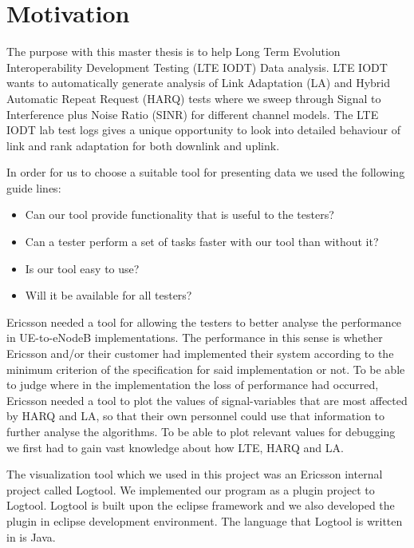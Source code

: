 \documentclass[cropmarks, frame, english]{idamasterthesis}
\begin{document}
\newpage

\section{Motivation}
The purpose with this master thesis is to help Long Term Evolution Interoperability Development Testing (LTE IODT) Data analysis. LTE IODT wants to automatically generate analysis of Link Adaptation (LA) and Hybrid Automatic Repeat Request (HARQ) tests where we sweep through Signal to Interference plus Noise Ratio (SINR) for different channel models. The LTE IODT lab test logs gives a unique opportunity to look into detailed behaviour of link and rank adaptation for both downlink and uplink. \newline

In order for us to choose a suitable tool for presenting data we used the following guide lines:

\begin{itemize}
	\item Can our tool provide functionality that is useful to the testers?
	\item Can a tester perform a set of tasks faster with our tool than without it?
	\item Is our tool easy to use?
	\item Will it be available for all testers?
\end{itemize} 

Ericsson needed a tool for allowing the testers to better analyse the performance in UE-to-eNodeB implementations. The performance in this sense is whether Ericsson and/or their customer had implemented their system according to the minimum criterion of the specification for said implementation or not. To be able to judge where in the implementation the loss of performance had occurred, Ericsson needed a tool to plot the values of signal-variables that are most affected by HARQ and LA, so that their own personnel could use that information to further analyse the algorithms. To be able to plot relevant values for debugging we first had to gain vast knowledge about how LTE, HARQ and LA. \newline

The visualization tool which we used in this project was an Ericsson internal project called Logtool. We implemented our program as a plugin project to Logtool. Logtool is built upon the eclipse framework and we also developed the plugin in eclipse development environment. The language that Logtool is written in is Java.
 
\end{document}
